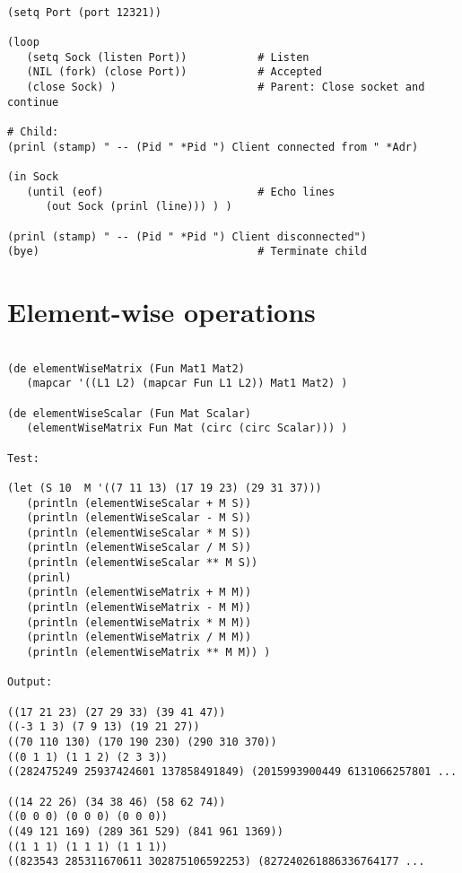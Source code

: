\begin{verbatim}

(setq Port (port 12321))

(loop
   (setq Sock (listen Port))           # Listen
   (NIL (fork) (close Port))           # Accepted
   (close Sock) )                      # Parent: Close socket and continue

# Child:
(prinl (stamp) " -- (Pid " *Pid ") Client connected from " *Adr)

(in Sock
   (until (eof)                        # Echo lines
      (out Sock (prinl (line))) ) )

(prinl (stamp) " -- (Pid " *Pid ") Client disconnected")
(bye)                                  # Terminate child

\end{verbatim}

\section*{Element-wise operations}

\begin{verbatim}

(de elementWiseMatrix (Fun Mat1 Mat2)
   (mapcar '((L1 L2) (mapcar Fun L1 L2)) Mat1 Mat2) )

(de elementWiseScalar (Fun Mat Scalar)
   (elementWiseMatrix Fun Mat (circ (circ Scalar))) )

Test:

(let (S 10  M '((7 11 13) (17 19 23) (29 31 37)))
   (println (elementWiseScalar + M S))
   (println (elementWiseScalar - M S))
   (println (elementWiseScalar * M S))
   (println (elementWiseScalar / M S))
   (println (elementWiseScalar ** M S))
   (prinl)
   (println (elementWiseMatrix + M M))
   (println (elementWiseMatrix - M M))
   (println (elementWiseMatrix * M M))
   (println (elementWiseMatrix / M M))
   (println (elementWiseMatrix ** M M)) )

Output:

((17 21 23) (27 29 33) (39 41 47))
((-3 1 3) (7 9 13) (19 21 27))
((70 110 130) (170 190 230) (290 310 370))
((0 1 1) (1 1 2) (2 3 3))
((282475249 25937424601 137858491849) (2015993900449 6131066257801 ...

((14 22 26) (34 38 46) (58 62 74))
((0 0 0) (0 0 0) (0 0 0))
((49 121 169) (289 361 529) (841 961 1369))
((1 1 1) (1 1 1) (1 1 1))
((823543 285311670611 302875106592253) (827240261886336764177 ...

\end{verbatim}

